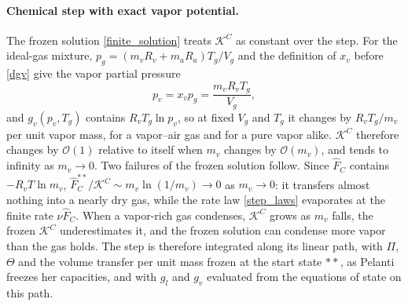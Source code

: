 \paragraph{Chemical step with exact vapor potential.}
The frozen solution \eqref{finite_solution} treats $\mathcal{K}^C$ as constant over the step. For the ideal-gas mixture, $p_g=(m_vR_v+m_aR_a)T_g/V_g$ and the definition of $x_v$ before \eqref{dgv} give the vapor partial pressure
\begin{equation}\label{pv_dalton}
p_v=x_vp_g=\frac{m_vR_vT_g}{V_g},
\end{equation}
and $g_v(p_v,T_g)$ contains $R_vT_g\ln p_v$, so at fixed $V_g$ and $T_g$ it changes by $R_vT_g/m_v$ per unit vapor mass, for a vapor--air gas and for a pure vapor alike. $\mathcal{K}^C$ therefore changes by $\mathcal{O}(1)$ relative to itself when $m_v$ changes by $\mathcal{O}(m_v)$, and tends to infinity as $m_v\to0$. Two failures of the frozen solution follow. Since $\hat{F}_C$ contains $-R_vT\ln m_v$, $\hat{F}_C^{**}/\mathcal{K}^C\sim m_v\ln(1/m_v)\to0$ as $m_v\to0$: it transfers almost nothing into a nearly dry gas, while the rate law \eqref{step_laws} evaporates at the finite rate $\nu\hat{F}_C$. When a vapor-rich gas condenses, $\mathcal{K}^C$ grows as $m_v$ falls, the frozen $\mathcal{K}^C$ underestimates it, and the frozen solution can condense more vapor than the gas holds. The step is therefore integrated along its linear path, with $\Pi$, $\Theta$ and the volume transfer per unit mass frozen at the start state $**$, as Pelanti freezes her capacities, and with $g_l$ and $g_v$ evaluated from the equations of state on this path.

